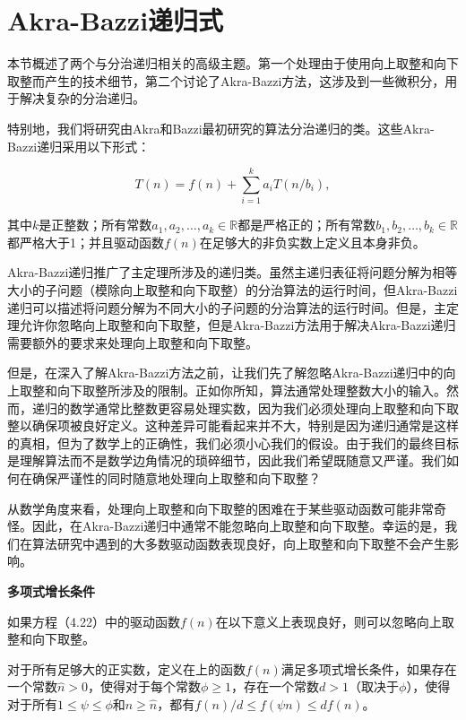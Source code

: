 \documentclass[lang=cn,newtx,10pt,scheme=chinese]{elegantbook}
\begin{document}
\section{Akra-Bazzi递归式}\label{section-4.7}

本节概述了两个与分治递归相关的高级主题。第一个处理由于使用向上取整和向下取整而产生的技术细节，第二个讨论了Akra-Bazzi方法，这涉及到一些微积分，用于解决复杂的分治递归。

特别地，我们将研究由Akra和Bazzi最初研究的算法分治递归的类。这些Akra-Bazzi递归采用以下形式：

\begin{equation}
T(n)=f(n)+\sum_{i=1}^k a_i T(n / b_i),
\end{equation}

其中$k$是正整数；所有常数$a_1, a_2, \ldots, a_k \in \mathbb{R}$都是严格正的；所有常数$b_1, b_2, \ldots, b_k \in \mathbb{R}$都严格大于1；并且驱动函数$f(n)$在足够大的非负实数上定义且本身非负。

Akra-Bazzi递归推广了主定理所涉及的递归类。虽然主递归表征将问题分解为相等大小的子问题（模除向上取整和向下取整）的分治算法的运行时间，但Akra-Bazzi递归可以描述将问题分解为不同大小的子问题的分治算法的运行时间。但是，主定理允许你忽略向上取整和向下取整，但是Akra-Bazzi方法用于解决Akra-Bazzi递归需要额外的要求来处理向上取整和向下取整。

但是，在深入了解Akra-Bazzi方法之前，让我们先了解忽略Akra-Bazzi递归中的向上取整和向下取整所涉及的限制。正如你所知，算法通常处理整数大小的输入。然而，递归的数学通常比整数更容易处理实数，因为我们必须处理向上取整和向下取整以确保项被良好定义。这种差异可能看起来并不大，特别是因为递归通常是这样的真相，但为了数学上的正确性，我们必须小心我们的假设。由于我们的最终目标是理解算法而不是数学边角情况的琐碎细节，因此我们希望既随意又严谨。我们如何在确保严谨性的同时随意地处理向上取整和向下取整？

从数学角度来看，处理向上取整和向下取整的困难在于某些驱动函数可能非常奇怪。因此，在Akra-Bazzi递归中通常不能忽略向上取整和向下取整。幸运的是，我们在算法研究中遇到的大多数驱动函数表现良好，向上取整和向下取整不会产生影响。

\textbf{多项式增长条件}

如果方程（4.22）中的驱动函数$f(n)$在以下意义上表现良好，则可以忽略向上取整和向下取整。

\begin{tcolorbox}
对于所有足够大的正实数，定义在上的函数$f(n)$满足多项式增长条件，如果存在一个常数$\hat{n}>0$，使得对于每个常数$\phi \geq 1$，存在一个常数$d>1$（取决于$\phi$），使得对于所有$1 \leq \psi \leq \phi$和$n \geq \hat{n}$，都有$f(n) / d \leq f(\psi n) \leq d f(n)$。
\end{tcolorbox}
\end{document}
